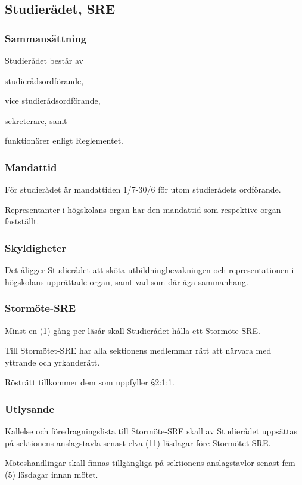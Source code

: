 \documentclass[10pt]{article}
\begin{document}
\subsection{Studierådet, SRE}
\subsubsection{Sammansättning}
Studierådet består av
\begin{alphlist}
\item studierådsordförande,
\item vice studierådsordförande,
\item sekreterare, samt
\item funktionärer enligt Reglementet.
\end{alphlist}


\subsubsection{Mandattid}
För studierådet är mandattiden 1/7-30/6 för utom studierådets ordförande.

Representanter i högskolans organ har den mandattid som respektive organ
fastställt.

\subsubsection{Skyldigheter}
Det åligger Studierådet att sköta utbildningbevakningen och representationen
i högskolans upprättade organ, samt vad som där äga sammanhang.

\subsubsection{Stormöte-SRE}
Minst en (1) gång per läsår skall Studierådet hålla ett Stormöte-SRE.

Till Stormötet-SRE har alla sektionens medlemmar rätt att närvara med
yttrande och yrkanderätt.

Rösträtt tillkommer dem som uppfyller §2:1:1.

\subsubsection{Utlysande}
Kallelse och föredragningslista till Stormöte-SRE skall av Studierådet
uppsättas på sektionens anslagstavla senast elva (11) läsdagar före
Stormötet-SRE.

Möteshandlingar skall finnas tillgängliga på sektionens anslagstavlor senast
fem (5) läsdagar innan mötet.
\newpage
\end{document}
